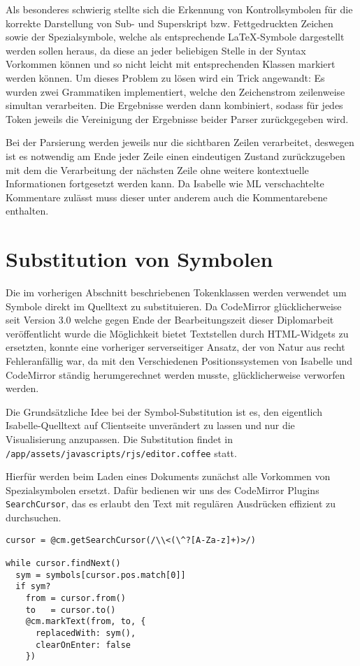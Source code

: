 Als besonderes schwierig stellte sich die Erkennung von Kontrollsymbolen für die korrekte
Darstellung von Sub- und Superskript bzw. Fettgedruckten Zeichen sowie der Spezialsymbole, welche
als entsprechende LaTeX-Symbole dargestellt werden sollen heraus, da diese an jeder beliebigen
Stelle in der Syntax Vorkommen können und so nicht leicht mit entsprechenden Klassen markiert werden
können. Um dieses Problem zu lösen wird ein Trick angewandt: Es wurden zwei Grammatiken
implementiert, welche den Zeichenstrom zeilenweise simultan verarbeiten. Die Ergebnisse werden dann
kombiniert, sodass für jedes Token jeweils die Vereinigung der Ergebnisse beider Parser
zurückgegeben wird.

Bei der Parsierung werden jeweils nur die sichtbaren Zeilen verarbeitet, deswegen ist es notwendig
am Ende jeder Zeile einen eindeutigen Zustand zurückzugeben mit dem die Verarbeitung der nächsten
Zeile ohne weitere kontextuelle Informationen fortgesetzt werden kann. Da Isabelle wie ML
verschachtelte Kommentare zulässt muss dieser unter anderem auch die Kommentarebene enthalten.

\section{Substitution von Symbolen}

Die im vorherigen Abschnitt beschriebenen Tokenklassen werden verwendet um Symbole direkt im
Quelltext zu substituieren. Da CodeMirror glücklicherweise seit Version 3.0 welche gegen Ende der
Bearbeitungszeit dieser Diplomarbeit veröffentlicht wurde die Möglichkeit bietet Textstellen durch
HTML-Widgets zu ersetzten, konnte eine vorheriger serverseitiger Ansatz, der von Natur aus recht
Fehleranfällig war, da mit den Verschiedenen Positionssystemen von Isabelle und CodeMirror ständig
herumgerechnet werden musste, glücklicherweise verworfen werden.

Die Grundsätzliche Idee bei der Symbol-Substitution ist es, den eigentlich Isabelle-Quelltext auf
Clientseite unverändert zu lassen und nur die Visualisierung anzupassen. Die Substitution findet in
\texttt{/app/assets/javascripts/rjs/editor.coffee} statt.

Hierfür werden beim Laden eines Dokuments zunächst alle Vorkommen von Spezialsymbolen ersetzt. Dafür
bedienen wir uns des CodeMirror Plugins \texttt{SearchCursor}, das es erlaubt den Text mit regulären
Ausdrücken effizient zu durchsuchen.

\begin{lstlisting}
cursor = @cm.getSearchCursor(/\\<(\^?[A-Za-z]+)>/)

while cursor.findNext()
  sym = symbols[cursor.pos.match[0]]
  if sym?
    from = cursor.from()
    to   = cursor.to()
    @cm.markText(from, to, {
      replacedWith: sym(),
      clearOnEnter: false
    })
\end{lstlisting}

